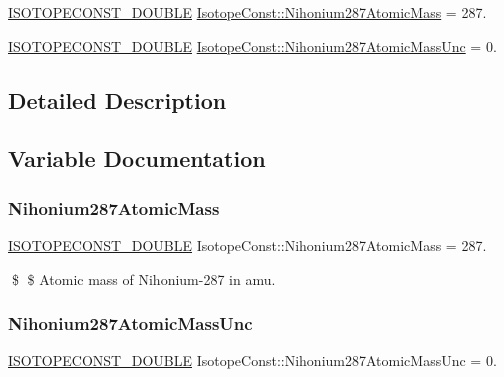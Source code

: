 \begin{DoxyCompactItemize}
\item 
\mbox{\hyperlink{group___isotope_const-_macros_ga8f45a7272ce02c0b4c65c44636ed719a}{I\+S\+O\+T\+O\+P\+E\+C\+O\+N\+S\+T\+\_\+\+D\+O\+U\+B\+LE}} \mbox{\hyperlink{group___isotope_const-_nihonium-_nh287_ga5ee6ea2c8188419f7a94515fe5231756}{Isotope\+Const\+::\+Nihonium287\+Atomic\+Mass}} = 287.
\item 
\mbox{\hyperlink{group___isotope_const-_macros_ga8f45a7272ce02c0b4c65c44636ed719a}{I\+S\+O\+T\+O\+P\+E\+C\+O\+N\+S\+T\+\_\+\+D\+O\+U\+B\+LE}} \mbox{\hyperlink{group___isotope_const-_nihonium-_nh287_ga2ce0f5ecd6abe0c483dfc7447124708d}{Isotope\+Const\+::\+Nihonium287\+Atomic\+Mass\+Unc}} = 0.
\end{DoxyCompactItemize}


\subsection{Detailed Description}


\subsection{Variable Documentation}
\mbox{\label{group___isotope_const-_nihonium-_nh287_ga5ee6ea2c8188419f7a94515fe5231756}} 
\subsubsection{\texorpdfstring{Nihonium287\+Atomic\+Mass}{Nihonium287AtomicMass}}
{\footnotesize\ttfamily \mbox{\hyperlink{group___isotope_const-_macros_ga8f45a7272ce02c0b4c65c44636ed719a}{I\+S\+O\+T\+O\+P\+E\+C\+O\+N\+S\+T\+\_\+\+D\+O\+U\+B\+LE}} Isotope\+Const\+::\+Nihonium287\+Atomic\+Mass = 287.}

\$ \$ Atomic mass of Nihonium-\/287 in amu. \mbox{\label{group___isotope_const-_nihonium-_nh287_ga2ce0f5ecd6abe0c483dfc7447124708d}} 
\subsubsection{\texorpdfstring{Nihonium287\+Atomic\+Mass\+Unc}{Nihonium287AtomicMassUnc}}
{\footnotesize\ttfamily \mbox{\hyperlink{group___isotope_const-_macros_ga8f45a7272ce02c0b4c65c44636ed719a}{I\+S\+O\+T\+O\+P\+E\+C\+O\+N\+S\+T\+\_\+\+D\+O\+U\+B\+LE}} Isotope\+Const\+::\+Nihonium287\+Atomic\+Mass\+Unc = 0.}

